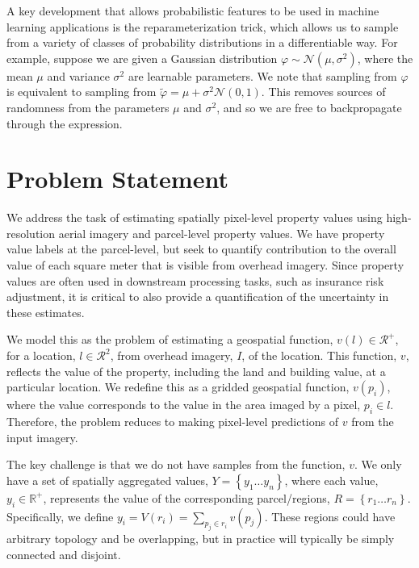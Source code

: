 \documentclass[10pt,twocolumn,letterpaper]{article}
\begin{document}
A key development that allows probabilistic features to be used in machine learning applications is the reparameterization trick\cite{Kingma2014AutoEncodingVB}, which allows us to sample from a variety of classes of probability distributions in a differentiable way. For example, suppose we are given a Gaussian distribution $\varphi \sim \mathcal{N}(\mu, \sigma^2)$, where the mean $\mu$ and variance $\sigma^2$ are learnable parameters. 
We note that sampling from $\varphi$ is equivalent to sampling from $\tilde{\varphi} = \mu + \sigma^2 \mathcal{N}(0, 1)$. This removes sources of randomness from the parameters $\mu$ and $\sigma^2$, and so we are free to backpropagate through the expression.

\section{Problem Statement}


We address the task of estimating spatially pixel-level property values using high-resolution aerial imagery and parcel-level property values. We have property value labels at the parcel-level, but seek to quantify contribution to the overall value of each square meter that is visible from overhead imagery. Since property values are often used in downstream processing tasks, such as insurance risk adjustment, it is critical to also provide a quantification of the uncertainty in these estimates.

We model this as the problem of estimating a geospatial function, $v(l)\in\mathcal{R}^+$, for a location, $l\in\mathcal{R}^2$, from overhead imagery, $I$, of the location. This function, $v$, reflects the value of the property, including the land and building value, at a particular location. We redefine this as a gridded geospatial function, $v(p_i)$, where the value corresponds to the value in the area imaged by a pixel, $p_i\in l$. Therefore, the problem reduces to making pixel-level predictions of $v$ from the input imagery.

The key challenge is that we do not have samples from the function, $v$.  We only have a set of spatially aggregated values, $Y=\left\{ y_1\ldots y_n\right\}$, where each value, $y_i \in \mathbb{R}^+$, represents the value of the corresponding parcel/regions, $R=\left\{ r_1\ldots r_n\right\}$. Specifically, we define $y_i = V(r_i) = \sum _{p_j\in r_i}v\left( p_j\right)$. These regions could have arbitrary topology and be overlapping, but in practice will typically be simply connected and disjoint.
\end{document}

